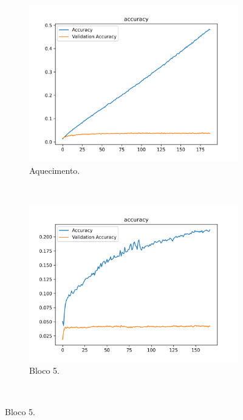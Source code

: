 \begin{figure}[H]
    \centering
    \caption{Evolução de Acurácia no conjunto de dados \textit{Food}-101.}
    \label{results:fig:datasets:3}
     \begin{subfigure}[t]{0.45\textwidth}
         \centering
         \includegraphics[width=1\linewidth]{recursos/imagens/results/food_wp_accuracy.png}
         \caption{Aquecimento.}
         \label{results:fig:datasets:3.1}
     \end{subfigure}%
     ~ 
     \begin{subfigure}[t]{0.45\textwidth}
         \centering
         \includegraphics[width=1\linewidth]{recursos/imagens/results/food_accuracy1.png}
         \caption{Bloco 5.}
         \label{results:fig:datasets:3.2}
     \end{subfigure}%
     ~ 
     

\end{figure}
